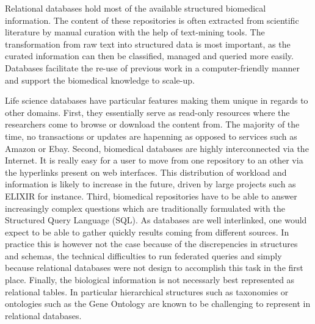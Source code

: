 \documentclass{bioinfo}
\begin{document}
Relational databases hold most of the available structured biomedical information. The content of these repositories is often
extracted from scientific literature by manual curation with the help of text-mining tools. The transformation from raw text into
structured data is most important, as the curated information can then be classified, managed and queried more easily. Databases facilitate
the re-use of previous work in a computer-friendly manner and support the biomedical knowledge to scale-up.

Life science databases have particular features making them unique in regards to other domains. First, they essentially serve as read-only 
resources where the researchers come to browse or download the content from. The majority of the time, no transactions or updates 
are hapenning as opposed to services such as Amazon or Ebay. Second, biomedical databases are highly interconnected via the Internet. 
It is really easy for a user to move from one repository to an other via the hyperlinks present on web interfaces. This distribution of workload 
and information is likely to increase in the future, driven by large projects such as ELIXIR for instance.
Third, biomedical repositories have to be able to answer increasingly complex questions which 
are traditionally formulated with the Structured Query Language (SQL). As databases are well interlinked, one would expect to be able to
gather quickly results coming from different sources. In practice this is however not the case because of the discrepencies in 
structures and schemas, the technical difficulties to run federated queries and simply because relational databases were not design to 
accomplish this task in the first place. Finally, the biological information is not necessarly best represented as relational tables. 
In particular hierarchical structures such as taxonomies or ontologies such as the Gene Ontology are known to be challenging 
to represent in relational databases. 
\end{document}
